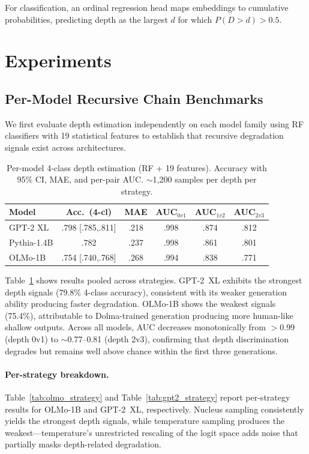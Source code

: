 \documentclass[11pt,a4paper]{article}
\begin{document}
For classification, an ordinal regression head maps embeddings to cumulative probabilities, predicting depth as the largest $d$ for which $P(D > d) > 0.5$.

\section{Experiments}
\label{sec:experiments}

\subsection{Per-Model Recursive Chain Benchmarks}
\label{sec:per_model}

We first evaluate depth estimation independently on each model family using RF classifiers with 19 statistical features to establish that recursive degradation signals exist across architectures.

\begin{table}[t]
\centering
\small
\caption{Per-model 4-class depth estimation (RF + 19 features). Accuracy with 95\% CI, MAE, and per-pair AUC. $\sim$1{,}200 samples per depth per strategy.}
\label{tab:per_model}
\begin{tabular}{@{}lccccc@{}}
\toprule
\textbf{Model} & \textbf{Acc.\ (4-cl)} & \textbf{MAE} & \textbf{AUC$_{0v1}$} & \textbf{AUC$_{1v2}$} & \textbf{AUC$_{2v3}$} \\
\midrule
GPT-2 XL & .798 [.785,.811] & .218 & .998 & .874 & .812 \\
Pythia-1.4B & .782 & .237 & .998 & .861 & .801 \\
OLMo-1B & .754 [.740,.768] & .268 & .994 & .838 & .771 \\
\bottomrule
\end{tabular}
\end{table}

Table~\ref{tab:per_model} shows results pooled across strategies.
GPT-2~XL exhibits the strongest depth signals (79.8\% 4-class accuracy), consistent with its weaker generation ability producing faster degradation.
OLMo-1B shows the weakest signals (75.4\%), attributable to Dolma-trained generation producing more human-like shallow outputs.
Across all models, AUC decreases monotonically from $>$0.99 (depth 0v1) to $\sim$0.77--0.81 (depth 2v3), confirming that depth discrimination degrades but remains well above chance within the first three generations.

\paragraph{Per-strategy breakdown.}
Table~\ref{tab:olmo_strategy} and Table~\ref{tab:gpt2_strategy} report per-strategy results for OLMo-1B and GPT-2~XL, respectively.
Nucleus sampling consistently yields the strongest depth signals, while temperature sampling produces the weakest---temperature's unrestricted rescaling of the logit space adds noise that partially masks depth-related degradation.
\end{document}

